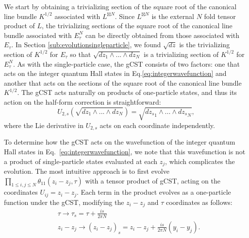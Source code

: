 \documentclass[a4paper,11pt]{article}
\begin{document}
 We start by obtaining a trivializing section of the square root of the canonical line bundle $K^{1/2}$ associated with $L^{\boxtimes N}$. Since $L^{\boxtimes N}$ is the external $N$ fold tensor product of $L$, the trivializing sections of the square root of the canonical line bundle associated with $E_{\tau}^{N}$ can be directly obtained from those associated with $E_{\tau}$. In Section \ref{sub:evolutionsingleparticle}, we found $\sqrt{dz}$ is the trivializing section of $K^{1/2}$ for $E_{\tau}$ so that $\sqrt{dz_{1}\wedge...\wedge dz_{N}}$ is a trivializing section of $K^{1/2}$ for $E_{\tau}^{N}$. As with the single-particle case, the gCST consists of two factors: one that acts on the integer quantum Hall states in Eq.\eqref{eq:integerwavefunction} and another that acts on the sections of the square root of the canonical line bundle $K^{1/2}$. The gCST acts naturally on products of one-particle states, and thus its action on the half-form correction is straightforward:
\begin{equation}
    U_{2,s}(\sqrt{dz_{1}\wedge...\wedge dz_{N}}) = \sqrt{d{z_s}_{1}\wedge...\wedge d{z_s}_{N}} 
    \label{eq:evolutionhalfformIQHE},
\end{equation}
where the Lie derivative in $U_{2,s}$ acts on each coordinate independently.

To determine how  the gCST acts on the wavefunction of the integer quantum Hall states in Eq.~\eqref{eq:integerwavefunction}, we note that this wavefunction is not a product of single-particle states evaluated at each $z_{j}$, which complicates the evolution. The most intuitive approach is to first evolve $\prod_{1\leq i,j\leq N}\theta_{11}(z_{i}-z_{j},\tau)$ with a tensor product of gCST, acting on the coordinates $U_{ij}=z_{i}-z_{j}$. Each term in the product evolves as a one-particle function under the gCST, modifying the $z_{i}-z_{j}$ and $\tau$ coordinates as follows:
\begin{align}
 \label{alterationtaus}
 &\tau\rightarrow \tau_{s} = \tau + \frac{is}{2\pi N}\\
 & z_{i}-z_{j} \rightarrow (z_{i}-z_{j})_{s} = z_{i}-z_{j}+\frac{is}{2\pi N}(y_{i}-y_{j}). 
 \label{alterationzs}
\end{align}
\end{document}
